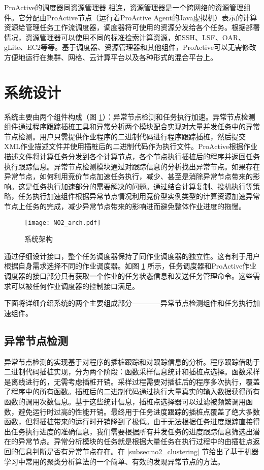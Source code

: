 ProActive的调度器同资源管理器 \cite{parm} 相连，资源管理器是一个跨网络的资源管理组件。它分配由ProActive节点（运行着ProActive Agent的Java虚拟机）表示的计算资源给管理任务工作流调度器，调度器将可使用的资源分发给各个任务。根据部署情况，资源管理器可以使用不同的标准检索计算资源，如SSH、LSF、OAR、gLite、EC2等等。基于调度器、资源管理器和其他组件，ProActive可以无需修改方便地运行在集群、网格、云计算平台以及各种形式的混合平台上。

\section{系统设计}
\label{sec:no2}
系统主要由两个组件构成（图 \ref{figure:no2arch}）：异常节点检测和任务执行加速。异常节点检测组件通过程序跟踪插桩工具和异常分析两个模块配合实现对大量并发任务中的异常节点检测。用户只需提供作业程序的二进制代码进行程序跟踪插桩，然后提交XML作业描述文件并使用插桩后的二进制代码作为执行文件。ProActive根据作业描述文件将计算任务分发到各个计算节点，各个节点执行插桩后的程序并返回任务执行跟踪信息。异常节点检测模块通过对跟踪信息的分析找出异常节点。如果存在异常节点，如何利用竞价节点加速任务执行，减少、甚至是消除异常节点带来的影响。这是任务执行加速部分的需要解决的问题。通过结合计算复制、投机执行等策略，任务执行加速组件根据异常节点情况利用竞价型实例类型的计算资源加速异常节点上任务的完成，减少异常节点带来的影响进而避免整体作业进度的拖慢。
\begin{figure}
  \centering
  \texttt{[image: NO2\_arch.pdf]}
  \caption{系统架构}
  \label{figure:no2arch}
\end{figure}

通过仔细设计接口，整个任务调度器保持了同作业调度器的独立性。这有利于用户根据自身需求选择不同的作业调度器。如图 \ref{figure:no2arch} 所示，任务调度器和ProActive作业调度器的接口部分只有获取一个作业的任务状态信息和发送任务管理命令。这些需求可以被任何作业调度器的控制接口满足。

下面将详细介绍系统的两个主要组成部分————异常节点检测组件和任务执行加速组件。

\subsection{异常节点检测}
\label{subsec:no2_trace}
异常节点检测的实现基于对程序的插桩跟踪和对跟踪信息的分析。程序跟踪借助于二进制代码插桩实现，分为两个阶段：函数采样信息统计和插桩点选择。函数采样是离线进行的，无需考虑插桩开销。采样过程需要对插桩后的程序多次执行，覆盖了程序中的所有函数。插桩后的二进制代码通过执行大量真实的输入数据获得所有函数的调用次数信息。基于这些统计信息，插桩点选择器可以过滤被频繁调用函数，避免运行时过高的性能开销。最终用于任务进度跟踪的插桩点覆盖了绝大多数函数，但将插桩带来的运行时开销降到了极低。由于无法根据任务进度跟踪直接得出任务执行进度的准确信息，我们需要根据所有并发任务的进度跟踪信息筛选出潜在的异常节点。异常分析模块的任务就是根据大量任务在执行过程中的由插桩点返回的信息判断是否有异常节点存在。在 \ref{subsec:no2_clustering} 节给出了基于机器学习中常用的聚类分析算法的一个简单、有效的发现异常节点的方法。

